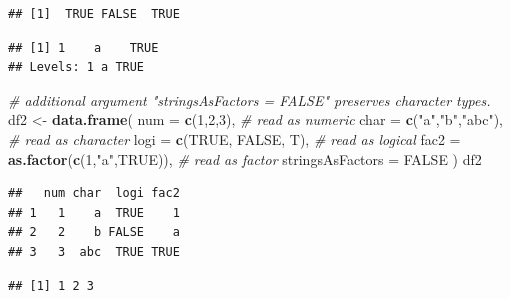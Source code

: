 \documentclass[]{book}
\newenvironment{Shaded}{\begin{snugshade}}{\end{snugshade}}
\newcommand{\KeywordTok}[1]{\textcolor[rgb]{0.13,0.29,0.53}{\textbf{{#1}}}}
\newcommand{\DataTypeTok}[1]{\textcolor[rgb]{0.13,0.29,0.53}{{#1}}}
\newcommand{\DecValTok}[1]{\textcolor[rgb]{0.00,0.00,0.81}{{#1}}}
\newcommand{\StringTok}[1]{\textcolor[rgb]{0.31,0.60,0.02}{{#1}}}
\newcommand{\CommentTok}[1]{\textcolor[rgb]{0.56,0.35,0.01}{\textit{{#1}}}}
\newcommand{\OtherTok}[1]{\textcolor[rgb]{0.56,0.35,0.01}{{#1}}}
\newcommand{\NormalTok}[1]{{#1}}
\theoremstyle{definition}
\theoremstyle{definition}
\theoremstyle{remark}
\begin{document}
\begin{verbatim}
## [1]  TRUE FALSE  TRUE
\end{verbatim}

\begin{Shaded}
\end{Shaded}

\begin{verbatim}
## [1] 1    a    TRUE
## Levels: 1 a TRUE
\end{verbatim}

\begin{Shaded}
\begin{Highlighting}[]
\CommentTok{# additional argument "stringsAsFactors = FALSE" preserves character types.}
\NormalTok{df2 <-}\StringTok{ }\KeywordTok{data.frame}\NormalTok{(}
        \DataTypeTok{num  =} \KeywordTok{c}\NormalTok{(}\DecValTok{1}\NormalTok{,}\DecValTok{2}\NormalTok{,}\DecValTok{3}\NormalTok{),           }\CommentTok{# read as numeric}
        \DataTypeTok{char =} \KeywordTok{c}\NormalTok{(}\StringTok{"a"}\NormalTok{,}\StringTok{"b"}\NormalTok{,}\StringTok{"abc"}\NormalTok{),   }\CommentTok{# read as character}
        \DataTypeTok{logi =} \KeywordTok{c}\NormalTok{(}\OtherTok{TRUE}\NormalTok{, }\OtherTok{FALSE}\NormalTok{, T),  }\CommentTok{# read as logical}
        \DataTypeTok{fac2  =} \KeywordTok{as.factor}\NormalTok{(}\KeywordTok{c}\NormalTok{(}\DecValTok{1}\NormalTok{,}\StringTok{"a"}\NormalTok{,}\OtherTok{TRUE}\NormalTok{)),      }\CommentTok{# read as factor}
        \DataTypeTok{stringsAsFactors =} \OtherTok{FALSE}
       \NormalTok{)  }
\NormalTok{df2}
\end{Highlighting}
\end{Shaded}

\begin{verbatim}
##   num char  logi fac2
## 1   1    a  TRUE    1
## 2   2    b FALSE    a
## 3   3  abc  TRUE TRUE
\end{verbatim}

\begin{Shaded}
\end{Shaded}

\begin{verbatim}
## [1] 1 2 3
\end{verbatim}
\end{document}
